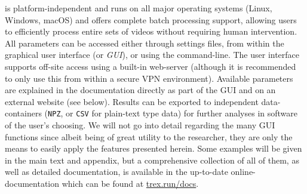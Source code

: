 \documentclass[9pt,lineno]{elife}
\newcommand{\TRex}{\protect\path{TRex}}
\newcommand{\changemade}[1]{#1}
\begin{document}
\TRex{} is platform-independent and runs on all major operating systems (Linux, Windows, macOS) and offers complete batch processing support, allowing users to efficiently process entire sets of videos without requiring human intervention. All parameters can be accessed either through settings files, from within the graphical user interface (or \textit{GUI}), or using the command-line. The user interface supports off-site access using a built-in web-server (although it is recommended to only use this from within a secure VPN environment). Available parameters are explained in the documentation directly as part of the GUI and on an external website (see below). Results can be exported to independent data-containers (\texttt{NPZ}, or \texttt{CSV} \changemade{for plain-text type data}) for further analyses in software of the user's choosing. We will not go into detail regarding the many GUI functions since albeit being of great utility to the researcher, they are only the means to easily apply the features presented herein. Some examples will be given in the main text and appendix, but a comprehensive collection of all of them, as well as detailed documentation, is available in the up-to-date online-documentation which can be found at \href{https://trex.run/docs}{trex.run/docs}.

\end{document}
